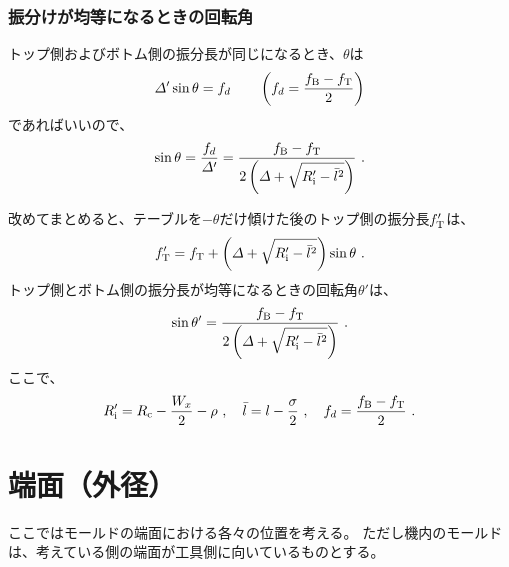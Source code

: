\subsection{振分けが均等になるときの回転角}
トップ側およびボトム側の振分長が同じになるとき、$\theta$は
\begin{align*}
  \varDelta'\sin\theta = f_d \qquad \left(f_d = \frac{f_\text B-f_\text T}2\right)
\end{align*}
であればいいので、
\begin{align*}
  \sin\theta = \frac{f_d}{\varDelta'} = \frac{f_\text B-f_\text T}{2\left(\varDelta+\sqrt{R_\text i'-\bar l^2}\right)}~.
\end{align*}
\begin{hosokubox}
改めてまとめると、テーブルを$-\theta$だけ傾けた後のトップ側の振分長$f_\text T'$は、
\begin{align*}
  f_\text T' = f_\text T+\left(\varDelta+\sqrt{R_\text i'-\bar l^2}\right)\sin\theta\ .
\end{align*}
トップ側とボトム側の振分長が均等になるときの回転角$\theta'$は、
\begin{align*}
  \sin\theta' = \frac{f_\text B-f_\text T}{2\left(\varDelta+\sqrt{R_\text i'-\bar l^2}\right)}\ .
\end{align*}
ここで、
\begin{align*}
  R_\text i' = R_\text c-\frac{W_x}2-\rho\ ,\quad
  \bar l = l-\frac\sigma2\ ,\quad
  f_d = \frac{f_\text B-f_\text T}2\ .
\end{align*}
\end{hosokubox}




\chapter{端面（外径）}
ここではモールドの端面における各々の位置を考える。
ただし機内のモールドは、考えている側の端面が工具側に向いているものとする。




